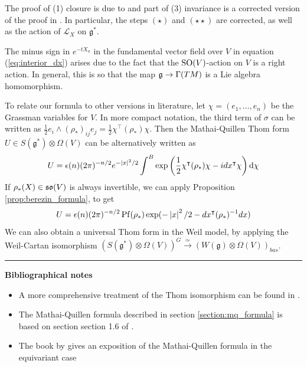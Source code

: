 The proof of (1) closure is due to \citet{guillemin} and part of (3) invariance
is a corrected version of the proof in \citet[p.27]{constantinescu}. In
particular, the steps $(\star)$ and  $(\star\star)$ are corrected, as well as
the action of $\mathcal{L}_X$ on $\mathfrak{g}^*$. 

\begin{remark}
	The minus sign in $e^{-tX_a}$ in the fundamental vector field over $V$ in
	equation (\ref{eq:interior_dx}) arises due to the fact that the
	$\operatorname{SO}(V)$-action on $V$ is a right action. In general, this is so that the
	map $\operatorname{\mathfrak{g}} \to \Gamma(TM)$ is a Lie algebra homomorphism. 
\end{remark}	
 
To relate our formula to other versions in literature, let $\chi =
(e_1,\ldots,e_n)$ be the Grassman variables for $V$. 
In more compact notation, the third term of $\sigma$ can be written  
as $\frac{1}{2} e_i \wedge (\rho_*)_{ij} e_j = \frac{1}{2} \chi^\intercal
(\rho_*) \chi$. Then the Mathai-Quillen Thom form 
$U\in S(\mathfrak{g}^*)\otimes \Omega(V)$ can be alternatively written as 
\begin{equation} \label{eq:universal_thom_form} %
	U = \epsilon(n)(2\pi)^{-n /2}e^{-\abs{x}^2 /2} 
	\int^B \exp \paren{\frac{1}{2}\chi^{\intercal}(\rho_*)\chi -
idx^{\intercal}\chi} \odif{\chi} 
\end{equation}
If $\rho_*(X)\in\operatorname{\mathfrak{so}}(V)$ is always invertible, we can apply
Proposition \ref{prop:berezin_formula}, to get
\[
U = \epsilon(n)(2\pi)^{-n/2} \Pf(\rho_*) \exp(-\abs{x}^2 /2-dx^{\intercal} (\rho_*)^{-1}dx)
\] 
We can also obtain a universal Thom form in the Weil model, by 
applying the Weil-Cartan isomorphism $(S(\mathfrak{g}^*)\otimes \Omega(V))^G
\xrightarrow{\simeq}(W(\mathfrak{g})\otimes \Omega(V))_{bas}$. 

\vspace{5mm}
\hrule 
\vspace{5mm}

\textbf{Bibliographical notes}
{\small
\begin{itemize}
	\item A more comprehensive treatment of the Thom isomorphism can be found in
		\citet{bott_tu}.  
	\item The Mathai-Quillen formula described in section
		\ref{section:mq_formula} is based on section 
		section 1.6 of \cite{bgv}.
	\item The book by \citet{guillemin} gives an exposition of the
	Mathai-Quillen formula in the equivariant case 
\end{itemize}
}
